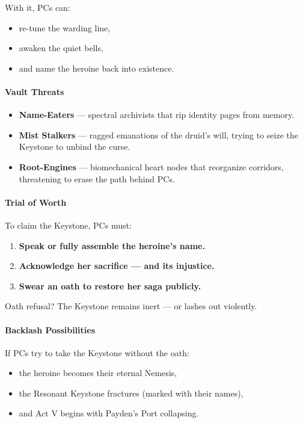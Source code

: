 \documentclass[11pt]{article}
\begin{document}
With it, PCs can:
\begin{itemize}
  \item re-tune the warding line,
  \item awaken the quiet bells,
  \item and name the heroine back into existence.
\end{itemize}

\paragraph{Vault Threats}

\begin{itemize}
  \item \textbf{Name-Eaters} ---  
        spectral archivists that rip identity pages from memory.

  \item \textbf{Mist Stalkers} ---  
        ragged emanations of the druid's will,
        trying to seize the Keystone to unbind the curse.

  \item \textbf{Root-Engines} ---  
        biomechanical heart nodes that reorganize corridors,  
        threatening to erase the path behind PCs.
\end{itemize}

\paragraph{Trial of Worth}  
To claim the Keystone, PCs must:

\begin{enumerate}
  \item \textbf{Speak or fully assemble the heroine's name.}
  \item \textbf{Acknowledge her sacrifice --- and its injustice.}
  \item \textbf{Swear an oath to restore her saga publicly.}
\end{enumerate}

Oath refusal?  
The Keystone remains inert --- or lashes out violently.

\paragraph{Backlash Possibilities}
If PCs try to take the Keystone without the oath:
\begin{itemize}
  \item the heroine becomes their eternal Nemesis,
  \item the Resonant Keystone fractures (marked with their names),
  \item and Act V begins with Payden's Port collapsing.
\end{itemize}
\end{document}
